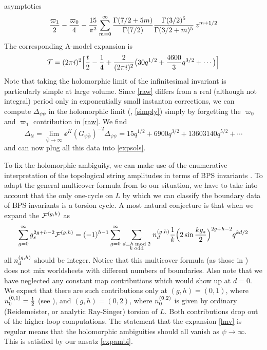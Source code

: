 asymptotics
\begin{equation}
\eqlabel{raw}
\frac{\varpi_1}2 - \frac{\varpi_0}4 - \frac{15}{\pi^2}
\sum_{m=0}^\infty \frac{\Gamma(7/2+5m)}{\Gamma(7/2)}
\frac{\Gamma(3/2)^5}{\Gamma(3/2+m)^5}\, z^{m+1/2} 
\end{equation}
The corresponding A-model expansion is
\begin{equation}
{\cal T} = (2\pi{\it i})^2 \Bigl[ \frac{t}2 - \frac 14 + \frac{2}{(2\pi{\it i})^2}
\bigl(30 q^{1/2} + \frac{4600}3 q^{3/2}+ \cdots \bigr)\Bigr]
\end{equation}
Note that taking the holomorphic limit of the infinitesimal invariant is
particularly simple at large volume. Since \eqref{raw} differs from a 
real (although not integral) period only in exponentially small instanton
corrections, we can compute $\Delta_{\psi\psi}$ in the holomorphic limit 
(\cf, \eqref{simply}) simply by forgetting the $\varpi_0$ and $\varpi_1$ 
contribution in \eqref{raw}. We find
\begin{equation}
\Delta_{tt} = \lim_{\bar\psi\to\infty} 
\ee^K (G_{\psi\bar\psi})^{-2}\Delta_{\psi\psi} = 
15 q^{1/2} + 6900 q^{3/2} + 13603140 q^{5/2} + \cdots 
\end{equation}
and can now plug all this data into \eqref{expsols}.

To fix the holomorphic ambiguity, we can make use of the enumerative 
interpretation of the topological string amplitudes in terms of
BPS invariants \cite{gova,oova,lmv}. To adapt the general multicover
formula from \cite{lmv} to our situation, we have to take into account 
that the only one-cycle on $L$ by which we can classify the boundary
data of BPS invariants is a torsion cycle. A most natural conjecture is
that when we expand the ${{\cal F}}^{(g,h)}$ as
\begin{equation}
\eqlabel{lmv}
\sum_{g=0}^\infty g_s^{2g+h-2} \F gh = (-1)^{h-1}
\sum_{g=0}^\infty \sum_{\topa{d\equiv h\bmod 2}{k\;{\rm odd}}} 
\n gh{{d}}
\frac 1k\Bigl(2\sin \frac{kg_s}2\Bigl)^{2g+h-2} q^{kd/2} 
\end{equation}
all $n^{(g,h)}_d$ should be integer. Notice that this multicover formula
(as those in \cite{lmv}) does not mix worldsheets with different numbers 
of boundaries. Also note that we have neglected any constant map 
contributions which would show up at $d=0$. We expect that there are 
such contributions only at $(g,h)=(0,1)$, where $n^{(0,1)}_0=\frac 12$ (see 
\cite{open}), and $(g,h)=(0,2)$, where $n^{(0,2)}_0$ is given by ordinary 
(Reidemeister, or analytic Ray-Singer) torsion of $L$. Both contributions 
drop out of the higher-loop computations. The statement that the expansion 
\eqref{lmv} is regular means that the holomorphic ambiguities 
should all vanish as $\psi\to\infty$. This is satisfied by our 
ansatz \eqref{expambi}.

